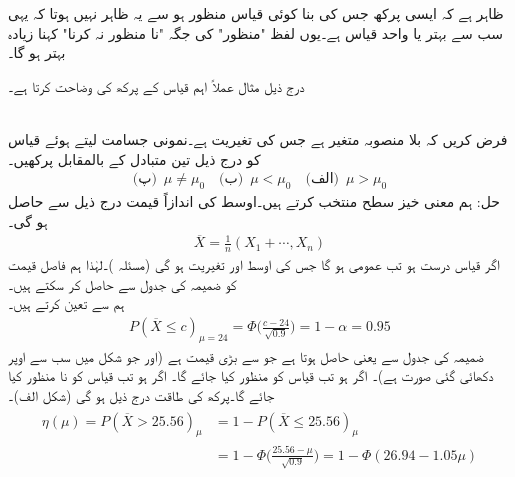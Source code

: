 ظاہر ہے کہ ایسی پرکھ جس کی بنا کوئی قیاس  منظور ہو سے یہ ظاہر نہیں ہوتا کہ یہی سب سے بہتر  یا واحد قیاس ہے۔یوں لفظ "منظور" کی جگہ "نا منظور نہ کرنا" کہنا زیادہ بہتر ہو گا۔ 

درج ذیل مثال عملاً اہم قیاس کے پرکھ کی وضاحت کرتا ہے۔ 

\quad {}\\
فرض کریں کہ  بلا منصوبہ متغیر ہے جس کی تغیریت  ہے۔نمونی جسامت  لیتے ہوئے قیاس  کو درج ذیل تین متبادل کے بالمقابل پرکھیں۔
\begin{align*}
\text{(پ)}\,\,\, \mu \ne \mu_0 \quad \text{(ب)}\,\,\, \mu<\mu_0 \quad \text{(الف)}\,\,\,  \mu>\mu_0
\end{align*}
حل:\quad
ہم معنی خیز سطح  منتخب کرتے ہیں۔اوسط کی اندازاً قیمت درج ذیل سے حاصل ہو گی۔
\begin{align*}
\overline{X}=\frac{1}{n}(X_1+\cdots,X_n)
\end{align*}
اگر قیاس درست ہو تب  عمومی ہو گا جس کی اوسط  اور تغیریت  ہو گی (مسئلہ )۔لہٰذا ہم فاصل قیمت  کو ضمیمہ  کی جدول  سے حاصل کر سکتے ہیں۔\\
\quad
ہم  سے  تعین کرتے ہیں۔
\begin{align*}
P(\overline{X}\le c)_{\mu=24}=\Phi\big(\frac{c-24}{\sqrt{0.9}}\big)=1-\alpha=0.95
\end{align*}
ضمیمہ  کی جدول   سے  یعنی  حاصل ہوتا ہے جو  سے بڑی قیمت ہے (اور جو شکل  میں سب سے اوپر دکھائی گئی صورت ہے)۔ اگر  ہو تب قیاس کو منظور کیا جائے گا۔ اگر  ہو تب قیاس کو نا منظور کیا جائے گا۔پرکھ کی طاقت درج ذیل ہو گی (شکل  الف)۔
\begin{gather}
\begin{aligned}
\eta(\mu)=P(\overline{X}>25.56)_{\mu}&=1-P(\overline{X}\le 25.56)_{\mu}\\
&=1-\Phi\big(\frac{25.56-\mu}{\sqrt{0.9}}\big)=1-\Phi(26.94-1.05\mu)
\end{aligned}
\end{gather}
